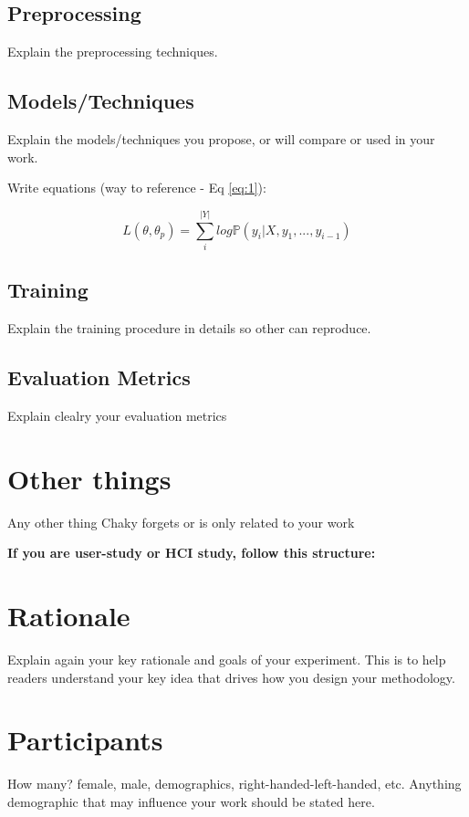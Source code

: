 \subsection{Preprocessing}
Explain the preprocessing techniques.

\subsection{Models/Techniques}
Explain the models/techniques you propose, or will compare or used in your work.

Write equations (way to reference - Eq \ref{eq:1}):

\begin{equation}
L(\theta , \theta_{p}) = \sum_{i}^{|Y|} log \mathbb{P}(y_{i} | X, y_{1}, ..., y_{i-1}) 
\label{eq:1}
\end{equation}

\subsection{Training}
Explain the training procedure in details so other can reproduce.

\subsection{Evaluation Metrics}
Explain clealry your evaluation metrics

\section{Other things}
Any other thing Chaky forgets or is only related to your work


\setcounter{section}{0}
\textbf{If you are user-study or HCI study,  follow this structure:
}

\section{Rationale}
Explain again your key rationale and goals of your experiment.  This is to help readers understand your key idea that drives how you design your methodology.

\section{Participants}
How many?  female, male,  demographics, right-handed-left-handed, etc.   Anything demographic that may influence your work should be stated here.

